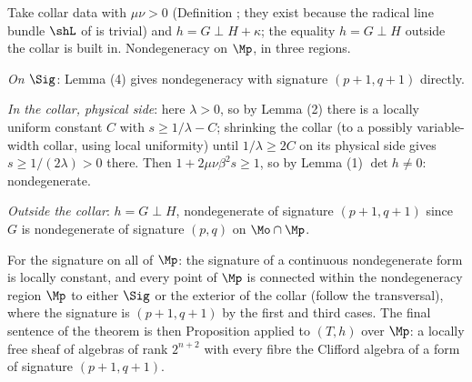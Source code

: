 Take collar data with $\mu\nu > 0$ (Definition ; they exist because the radical line bundle $\shL$ of  is trivial) and $h = G \perp H + \kappa$; the equality $h = G \perp H$ outside the collar is built in. Nondegeneracy on $\Mp$, in three regions.

\emph{On $\Sig$}: Lemma (4) gives nondegeneracy with signature $(p{+}1, q{+}1)$ directly.

\emph{In the collar, physical side}: here $\lambda > 0$, so by Lemma (2) there is a locally uniform constant $C$ with $s \geq 1/\lambda - C$; shrinking the collar (to a possibly variable-width collar, using local uniformity) until $1/\lambda \geq 2C$ on its physical side gives $s \geq 1/(2\lambda) > 0$ there. Then $1 + 2\mu\nu\beta^2 s \geq 1$, so by Lemma (1) $\det h \neq 0$: nondegenerate.

\emph{Outside the collar}: $h = G \perp H$, nondegenerate of signature $(p{+}1,q{+}1)$ since $G$ is nondegenerate of signature $(p,q)$ on $\Mo \cap \Mp$.

For the signature on all of $\Mp$: the signature of a continuous nondegenerate form is locally constant, and every point of $\Mp$ is connected within the nondegeneracy region $\Mp$ to either $\Sig$ or the exterior of the collar (follow the transversal), where the signature is $(p{+}1,q{+}1)$ by the first and third cases. The final sentence of the theorem is then Proposition  applied to $(T, h)$ over $\Mp$: a locally free sheaf of algebras of rank $2^{n+2}$ with every fibre the Clifford algebra of a form of signature $(p{+}1, q{+}1)$.
